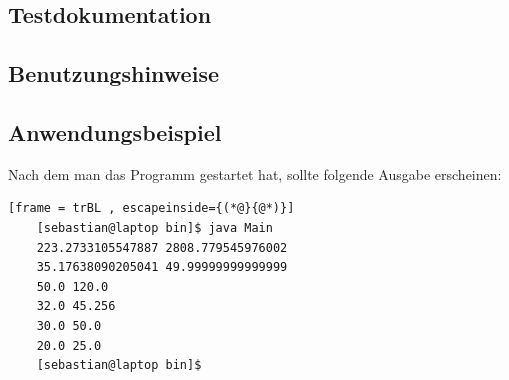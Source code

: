 \subsection{Testdokumentation}


\subsection{Benutzungshinweise}


\subsection{Anwendungsbeispiel}
Nach dem man das Programm gestartet hat, sollte folgende Ausgabe erscheinen:
\begin{lstlisting}[frame = trBL , escapeinside={(*@}{@*)}]
	[sebastian@laptop bin]$ java Main
	223.2733105547887 2808.779545976002
	35.17638090205041 49.99999999999999
	50.0 120.0
	32.0 45.256
	30.0 50.0
	20.0 25.0
	[sebastian@laptop bin]$ 
\end{lstlisting}
